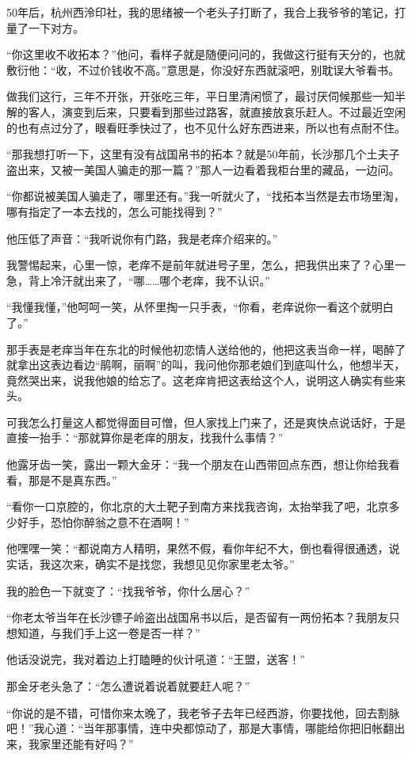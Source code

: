 50年后，杭州西泠印社，我的思绪被一个老头子打断了，我合上我爷爷的笔记，打量了一下对方。

“你这里收不收拓本？”他问，看样子就是随便问问的，我做这行挺有天分的，也就敷衍他：“收，不过价钱收不高。”意思是，你没好东西就滚吧，别耽误大爷看书。

做我们这行，三年不开张，开张吃三年，平日里清闲惯了，最讨厌伺候那些一知半解的客人，演变到后来，只要看到那些过路客，就直接放哀乐赶人。不过最近空闲的也有点过分了，眼看旺季快过了，也不见什么好东西进来，所以也有点耐不住。

“那我想打听一下，这里有没有战国帛书的拓本？就是50年前，长沙那几个土夫子盗出来，又被一美国人骗走的那一篇？”那人一边看着我柜台里的藏品，一边问。

“你都说被美国人骗走了，哪里还有。”我一听就火了，“找拓本当然是去市场里淘，哪有指定了一本去找的，怎么可能找得到？”

他压低了声音：“我听说你有门路，我是老痒介绍来的。”

我警惕起来，心里一惊，老痒不是前年就进号子里，怎么，把我供出来了？心里一急，背上冷汗就出来了，“哪……哪个老痒，我不认识。”

“我懂我懂，”他呵呵一笑，从怀里掏一只手表，“你看，老痒说你一看这个就明白了。”

那手表是老痒当年在东北的时候他初恋情人送给他的，他把这表当命一样，喝醉了就拿出这表边看边“鹃啊，丽啊”的叫，我问他你那老娘们到底叫什么，他想半天，竟然哭出来，说我他娘的给忘了。这老痒肯把这表给这个人，说明这人确实有些来头。

可我怎么打量这人都觉得面目可憎，但人家找上门来了，还是爽快点说话好，于是直接一抬手：“那就算你是老痒的朋友，找我什么事情？”

他露牙齿一笑，露出一颗大金牙：“我一个朋友在山西带回点东西，想让你给我看看，那是不是真东西。”

“看你一口京腔的，你北京的大土靶子到南方来找我咨询，太抬举我了吧，北京多少好手，恐怕你醉翁之意不在酒啊！”

他嘿嘿一笑：“都说南方人精明，果然不假，看你年纪不大，倒也看得很通透，说实话，我这次来，确实不是找您，我想见见你家里老太爷。”

我的脸色一下就变了：“找我爷爷，你什么居心？”

“你老太爷当年在长沙镖子岭盗出战国帛书以后，是否留有一两份拓本？我朋友只想知道，与我们手上这一卷是否一样？”

他话没说完，我对着边上打瞌睡的伙计吼道：“王盟，送客！”

那金牙老头急了：“怎么遭说着说着就要赶人呢？”

“你说的是不错，可惜你来太晚了，我老爷子去年已经西游，你要找他，回去割脉吧！”我心道：“当年那事情，连中央都惊动了，那是大事情，哪能给你把旧帐翻出来，我家里还能有好吗？”


